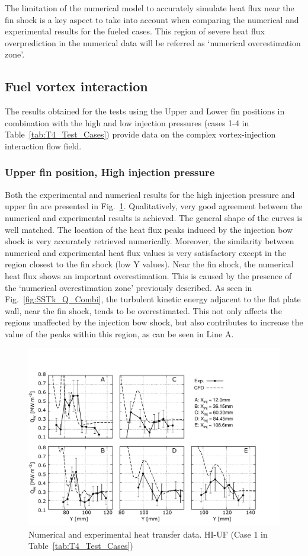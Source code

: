 \documentclass{AIAA}
\begin{document}
The limitation of the numerical model to accurately simulate heat flux near the fin shock is a key aspect to take into account when comparing the numerical and experimental results for the fueled cases. 
This region of severe heat flux overprediction in the numerical data will be referred as `numerical overestimation zone'.




\subsection{Fuel vortex interaction}

The results obtained for the tests using the Upper and Lower fin positions in combination with the high and low injection pressures (cases 1-4 in Table~\ref{tab:T4_Test_Cases}) provide data on the complex vortex-injection interaction flow field.


\subsubsection{Upper fin position, High injection pressure}

Both the experimental and numerical results for the high injection pressure and upper fin are presented in Fig.~\ref{fig:HeatFluxLPHIUF}. Qualitatively, very good agreement between the numerical and experimental results is achieved. The general shape of the curves is well matched. The location of the heat flux peaks induced by the injection bow shock is very accurately retrieved numerically. Moreover, the similarity between numerical and experimental heat flux values is very satisfactory except in the region closest to the fin shock (low Y values). Near the fin shock, the numerical heat flux shows an important overestimation. This is caused by the presence of the `numerical overestimation zone' previously described. As seen in Fig.~\ref{fig:SSTk_Q_Combi}, the turbulent kinetic energy adjacent to the flat plate wall, near the fin shock, tends to be overestimated. This not only affects the regions unaffected by the injection bow shock, but also contributes to increase the value of the peaks within this region, as can be seen in Line A. 

%
\begin{figure}[!h]
\center
\includegraphics[trim = 0mm 3mm 25mm 25mm, clip, width=0.60\columnwidth,valign=t,fbox]{Figures/Data/LP_HI_UF/GNUP_CFD_GaugesLines_Multi.pdf}
\caption{Numerical and experimental heat transfer data. HI-UF (Case 1 in Table~\ref{tab:T4_Test_Cases})}
\label{fig:HeatFluxLPHIUF}
\end{figure} 
\end{document}
